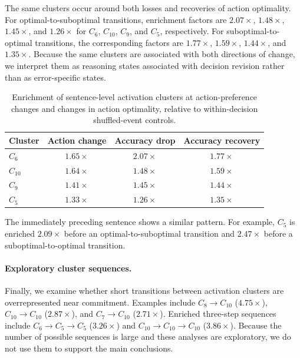 \documentclass{article}
\begin{document}
The same clusters occur around both losses and recoveries of action
optimality. For optimal-to-suboptimal transitions, enrichment factors are
\(2.07\times\), \(1.48\times\), \(1.45\times\), and \(1.26\times\) for
\(C_6\), \(C_{10}\), \(C_9\), and \(C_5\), respectively. For
suboptimal-to-optimal transitions, the corresponding factors are
\(1.77\times\), \(1.59\times\), \(1.44\times\), and \(1.35\times\).
Because the same clusters are associated with both directions of change, we
interpret them as reasoning states associated with decision revision rather
than as error-specific states.

\begin{table}[htbp]
\centering
\small
\begin{tabular}{lccc}
\toprule
Cluster & Action change & Accuracy drop & Accuracy recovery \\
\midrule
\(C_6\)    & \(1.65\times\) & \(2.07\times\) & \(1.77\times\) \\
\(C_{10}\) & \(1.64\times\) & \(1.48\times\) & \(1.59\times\) \\
\(C_9\)    & \(1.41\times\) & \(1.45\times\) & \(1.44\times\) \\
\(C_5\)    & \(1.33\times\) & \(1.26\times\) & \(1.35\times\) \\
\bottomrule
\end{tabular}
\caption{Enrichment of sentence-level activation clusters at
action-preference changes and changes in action optimality, relative to
within-decision shuffled-event controls.}
\label{tab:reasoning-events-app}
\end{table}

The immediately preceding sentence shows a similar pattern. For example,
\(C_5\) is enriched \(2.09\times\) before an optimal-to-suboptimal transition
and \(2.47\times\) before a suboptimal-to-optimal transition.

\paragraph{Exploratory cluster sequences.}
Finally, we examine whether short transitions between activation clusters are
overrepresented near commitment. Examples include
\(C_8\!\rightarrow C_{10}\) (\(4.75\times\)),
\(C_{10}\!\rightarrow C_{10}\) (\(2.87\times\)), and
\(C_7\!\rightarrow C_{10}\) (\(2.71\times\)). Enriched three-step sequences
include \(C_6\!\rightarrow C_5\!\rightarrow C_5\) (\(3.26\times\)) and
\(C_{10}\!\rightarrow C_{10}\!\rightarrow C_{10}\) (\(3.86\times\)).
Because the number of possible sequences is large and these analyses are
exploratory, we do not use them to support the main conclusions.

\newpage

\end{document}

